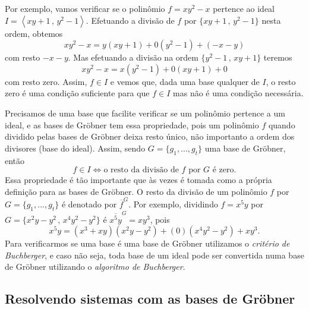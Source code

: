 Por exemplo, vamos verificar se o polinômio $f=xy^2-x$ pertence ao ideal $I=\left\langle xy+1\,,\,y^2-1 \right\rangle$. Efetuando a divisão de $f$ por $\{xy+1\,,\,y^2-1\}$ nesta ordem, obtemos
\begin{equation*}
xy^2-x=y(xy+1)+0(y^2-1)+(-x-y)
\end{equation*}  
com resto $-x-y$. Mas efetuando a divisão na ordem $\{y^2-1\,,\,xy+1\}$ teremos
\begin{equation*}
xy^2-x=x(y^2-1)+0(xy+1)+0
\end{equation*} 
com resto zero. Assim, $f\in I$ e vemos que, dada uma base qualquer de $I$, o resto zero é uma condição suficiente para que $f\in I$ mas não é uma condição necessária. 

Precisamos de uma base que facilite verificar se um polinômio pertence a um ideal, e as bases de Gr\"obner tem essa propriedade, pois um polinômio $f$ quando dividido pelas bases de Gr\"obner deixa resto único, não importanto a ordem dos divisores (base do ideal). Assim, sendo $G=\{g_1,...,g_t\}$ uma base de Gr\"obner, então 
\begin{equation*}
f\in I \Leftrightarrow \text{o resto da divisão de $f$ por $G$ é zero}.
\end{equation*}
Essa propriedade é tão importante que às vezes é tomada como a própria definição para as bases de Gr\"obner. O resto da divisão de um polinômio $f$ por $G=\{g_1,...,g_t\}$ é denotado por $\overline{f}^G$. Por exemplo, dividindo $f=x^5y$ por $G=\{x^2y-y^2\,,\,x^4y^2-y^2\}$ é $\overline{x^5y}^G=xy^3$, pois
\begin{equation*}
x^5y=(x^3+xy)(x^2y-y^2)+(0)(x^4y^2-y^2)+xy^3.
\end{equation*}
Para verificarmos se uma base é uma base de Gr\"obner utilizamos o {\it critério de Buchberger}, e caso não seja, toda base de um ideal pode ser convertida numa base de Gr\"obner utilizando o {\it algoritmo de Buchberger}. 

\subsection{Resolvendo sistemas com as bases de Gr\"obner}

